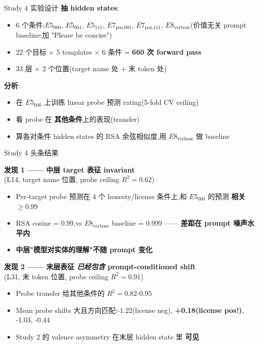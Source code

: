 \documentclass[aspectratio=169,11pt]{ctexbeamer}
\newcommand{\hi}[1]{\textcolor{ow-red}{\textbf{#1}}}
\newcommand{\hib}[1]{\textcolor{ow-blue}{\textbf{#1}}}
\newcommand{\sub}[1]{{\small\color{ow-gray}#1}}
\begin{document}
\begin{frame}{Study 4 实验设计}
\textbf{抽 hidden states}:
\begin{itemize}\setlength{\itemsep}{0pt}
\item 6 个条件:$E5_{000}$, $E5_{001}$, $E5_{111}$, $E7_\text{pos,001}$, $E7_\text{pos,111}$, \hi{$E8_\text{verbose}$}(价值无关 prompt baseline:加 "Please be concise")
\item 22 个目标 × 5 templates × 6 条件 = \hi{660 次 forward pass}
\item 33 层 × 2 个位置(target name 处 + 末 token 处)
\end{itemize}

\bigskip
\textbf{分析}:
\begin{itemize}\setlength{\itemsep}{0pt}
\item 在 $E5_{000}$ 上训练 linear probe 预测 rating(5-fold CV ceiling)
\item 看 probe 在 \hib{其他条件}上的表现(transfer)
\item 算各对条件 hidden states 的 RSA 余弦相似度,用 $E8_\text{verbose}$ 做 baseline
\end{itemize}
\end{frame}

\begin{frame}{Study 4 头条结果}

\textbf{发现 1 —— 中层 target 表征 invariant}\\
\sub{(L14, target name 位置, probe ceiling $R^2 = 0.62$)}
\begin{itemize}\setlength{\itemsep}{0pt}
\item Per-target probe 预测在 4 个 honesty/license 条件上,和 $E5_{000}$ 的预测 \hi{相关 $\geq 0.99$}
\item RSA cosine = 0.99,vs $E8_\text{verbose}$ baseline = 0.999 —— \hib{差距在 prompt 噪声水平内}
\item \hi{中层"模型对实体的理解"不随 prompt 变化}
\end{itemize}

\bigskip
\textbf{发现 2 —— 末层表征 \emph{已经包含} prompt-conditioned shift}\\
\sub{(L31, 末 token 位置, probe ceiling $R^2 = 0.91$)}
\begin{itemize}\setlength{\itemsep}{0pt}
\item Probe transfer 给其他条件的 $R^2 = 0.82$-$0.95$
\item Mean probe shifts 大且方向匹配:-1.22(license neg), \hi{+0.18(license pos!)}, -1.03, -0.44
\item Study 2 的 valence asymmetry 在末层 hidden state 里 \hib{可见}
\end{itemize}
\end{frame}
\end{document}
